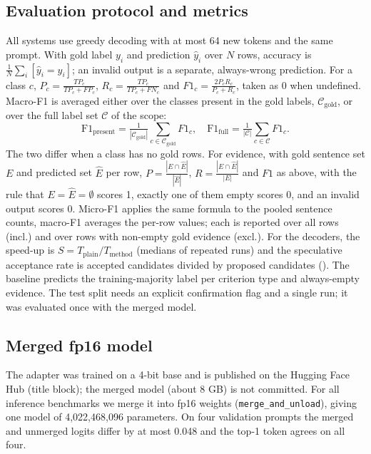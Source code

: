 \documentclass[conference]{IEEEtran}
\newcommand{\code}[1]{\texttt{#1}}
\begin{document}
\subsection{Evaluation protocol and metrics}\label{sec:metrics}
All systems use greedy decoding with at most 64 new tokens and the same prompt. %
With gold label $y_i$ and prediction $\hat y_i$ over $N$ rows, accuracy is $\frac1N\sum_i[\hat y_i=y_i]$; an invalid output is a separate, always-wrong prediction. For a class $c$, $P_c=\frac{TP_c}{TP_c+FP_c}$, $R_c=\frac{TP_c}{TP_c+FN_c}$ and $F1_c=\frac{2P_cR_c}{P_c+R_c}$, taken as 0 when undefined. Macro-F1 is averaged either over the classes present in the gold labels, $\mathcal C_{\mathrm{gold}}$, or over the full label set $\mathcal C$ of the scope:
\begin{equation}
\mathrm{F1}_{\mathrm{present}}=\tfrac{1}{|\mathcal C_{\mathrm{gold}}|}\sum_{c\in\mathcal C_{\mathrm{gold}}}F1_c,\quad
\mathrm{F1}_{\mathrm{full}}=\tfrac{1}{|\mathcal C|}\sum_{c\in\mathcal C}F1_c .\label{eq:macro}
\end{equation}
The two differ when a class has no gold rows. For evidence, with gold sentence set $E$ and predicted set $\hat E$ per row, $P=\frac{|E\cap\hat E|}{|\hat E|}$, $R=\frac{|E\cap\hat E|}{|E|}$ and $F1$ as above, with the rule that $E=\hat E=\emptyset$ scores 1, exactly one of them empty scores 0, and an invalid output scores 0. Micro-F1 applies the same formula to the pooled sentence counts, macro-F1 averages the per-row values; each is reported over all rows (incl.) and over rows with non-empty gold evidence (excl.). For the decoders, the speed-up is $S=T_{\mathrm{plain}}/T_{\mathrm{method}}$ (medians of repeated runs) and the speculative acceptance rate is accepted candidates divided by proposed candidates (). The baseline predicts the training-majority label per criterion type and always-empty evidence. %
The test split needs an explicit confirmation flag and a single run; it was evaluated once with the merged model. %

\subsection{Merged fp16 model}
The adapter was trained on a 4-bit base and is published on the Hugging Face Hub (title block); the merged model (about 8 GB) is not committed. For all inference benchmarks we merge it into fp16 weights (\code{merge\_and\_unload}), giving one model of 4,022,468,096 parameters. %
On four validation prompts the merged and unmerged logits differ by at most 0.048 and the top-1 token agrees on all four. %
\end{document}
